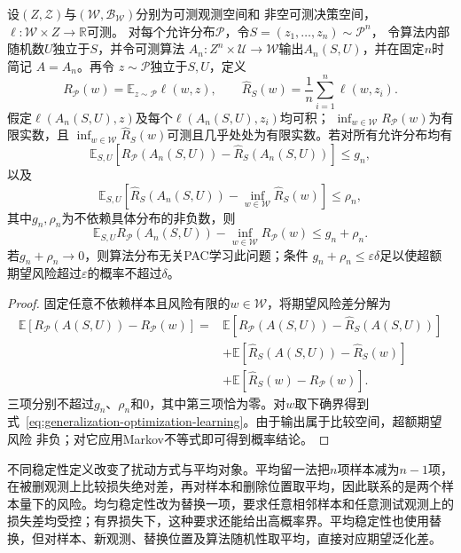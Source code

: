 \begin{theorem}[期望泛化差与经验最优性]
\label{thm:generalization-optimization-learning}
设$(Z,\mathcal Z)$与$(\mathcal W,\mathcal B_{\mathcal W})$分别为可测观测空间和
非空可测决策空间，$\ell:\mathcal W\times Z\to\mathbb R$可测。
对每个允许分布$\mathcal P$，令$S=(z_1,\ldots,z_n)\sim\mathcal P^n$，
令算法内部随机数$U$独立于$S$，并令可测算法
$A_n:Z^n\times\mathcal U\to\mathcal W$输出$A_n(S,U)$，并在固定$n$时简记
$A=A_n$。再令
$z\sim\mathcal P$独立于$S,U$，定义
\[
 R_{\mathcal P}(w)=\mathbb E_{z\sim\mathcal P}\ell(w,z),
 \qquad
 \hat R_S(w)=\frac1n\sum_{i=1}^n\ell(w,z_i).
\]
假定$\ell(A_n(S,U),z)$及每个$\ell(A_n(S,U),z_i)$均可积；
$\inf_{w\in\mathcal W}R_{\mathcal P}(w)$为有限实数，且
$\inf_{w\in\mathcal W}\hat R_S(w)$可测且几乎处处为有限实数。若对所有允许分布均有
\[
 \mathbb E_{S,U}[R_{\mathcal P}(A_n(S,U))-\hat R_S(A_n(S,U))]\leq g_n,
\]
以及
\[
 \mathbb E_{S,U}\!\left[\hat R_S(A_n(S,U))-
 \inf_{w\in\mathcal W}\hat R_S(w)\right]\leq\rho_n,
\]
其中$g_n,\rho_n$为不依赖具体分布的非负数，则
\begin{equation}
 \mathbb E_{S,U}R_{\mathcal P}(A_n(S,U))-
 \inf_{w\in\mathcal W}R_{\mathcal P}(w)
 \leq g_n+\rho_n.
 \label{eq:generalization-optimization-learning}
\end{equation}
若$g_n+\rho_n\to0$，则算法分布无关PAC学习此问题；条件
$g_n+\rho_n\leq\varepsilon\delta$足以使超额期望风险超过$\varepsilon$的概率不超过$\delta$。
\end{theorem}
\begin{proof}
固定任意不依赖样本且风险有限的$w\in\mathcal W$，将期望风险差分解为
\begin{align*}
 \mathbb E[R_{\mathcal P}(A(S,U))-R_{\mathcal P}(w)]
 ={}&\mathbb E[R_{\mathcal P}(A(S,U))-\hat R_S(A(S,U))]\\
 &+\mathbb E[\hat R_S(A(S,U))-\hat R_S(w)]\\
 &+\mathbb E[\hat R_S(w)-R_{\mathcal P}(w)].
\end{align*}
三项分别不超过$g_n$、$\rho_n$和0，其中第三项恰为零。对$w$取下确界得到
式~\eqref{eq:generalization-optimization-learning}。由于输出属于比较空间，超额期望风险
非负；对它应用Markov不等式即可得到概率结论。
\end{proof}

不同稳定性定义改变了扰动方式与平均对象。平均留一法把$n$项样本减为$n-1$项，在被删观测上比较损失绝对差，再对样本和删除位置取平均，因此联系的是两个样本量下的风险。均匀稳定性改为替换一项，要求任意相邻样本和任意测试观测上的损失差均受控；有界损失下，这种要求还能给出高概率界。平均稳定性也使用替换，但对样本、新观测、替换位置及算法随机性取平均，直接对应期望泛化差。

